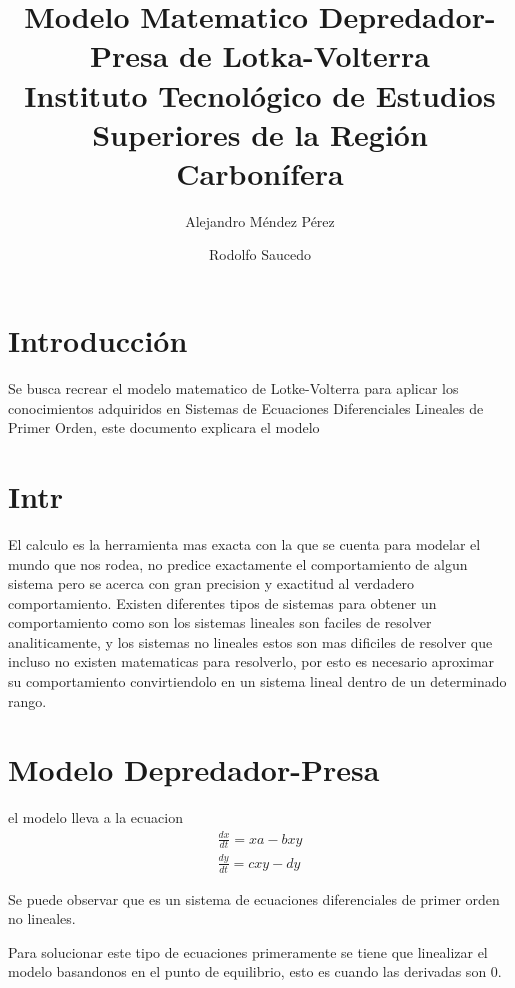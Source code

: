 \documentclass{report}
\title{
	{Modelo Matematico Depredador-Presa de Lotka-Volterra}\\
	{\large Instituto Tecnológico de Estudios Superiores de la Región Carbonífera}\\
}
\author{Alejandro Méndez Pérez \and Rodolfo Saucedo}
\begin{document}

\maketitle
\newpage
\tableofcontents
\chapter*{Introducción}
Se busca recrear el modelo matematico de Lotke-Volterra para aplicar los conocimientos adquiridos en Sistemas de Ecuaciones Diferenciales Lineales de Primer Orden, este documento explicara el modelo

\chapter*{Intr}
El calculo es la herramienta mas exacta con la que se cuenta para modelar el mundo que nos rodea, no predice exactamente el comportamiento de algun sistema pero se acerca con gran precision y exactitud al verdadero comportamiento. Existen diferentes tipos de sistemas para obtener un comportamiento como son los sistemas lineales son faciles de resolver analiticamente, y los sistemas no lineales estos son mas dificiles de resolver que incluso no existen matematicas para resolverlo, por esto es necesario aproximar su comportamiento convirtiendolo en un sistema lineal dentro de un determinado rango.

\chapter{Modelo Depredador-Presa}

el modelo lleva a la ecuacion 
\begin{align}
\frac{dx}{dt}= xa-bxy  \\
\frac{dy}{dt}= cxy-dy
\end{align}

Se puede observar que es un sistema de ecuaciones diferenciales de primer orden no lineales.

Para solucionar este tipo de ecuaciones primeramente se tiene que linealizar el modelo basandonos en el punto de equilibrio, esto es cuando las derivadas son 0.

\end{document}
